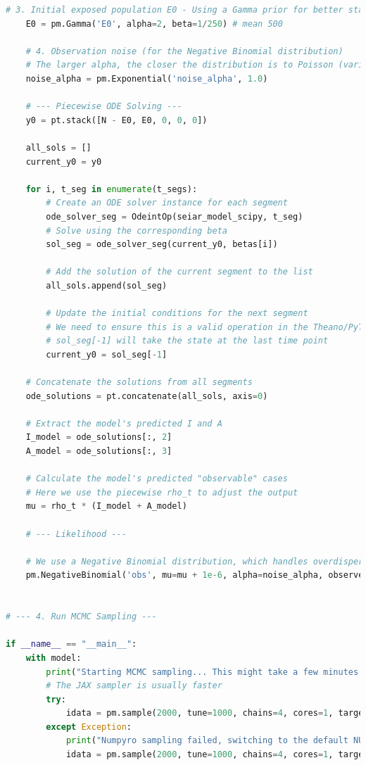 \documentclass[12pt, a4paper]{article}
\begin{document}
\begin{lstlisting}[language=Python, caption=Python script for constructing and sampling the Bayesian SEIAR model using PyMC.]
    # 3. Initial exposed population E0 - Using a Gamma prior for better stability
    E0 = pm.Gamma('E0', alpha=2, beta=1/250) # mean 500
    
    # 4. Observation noise (for the Negative Binomial distribution)
    # The larger alpha, the closer the distribution is to Poisson (variance=mean); the smaller alpha, the larger the variance (overdispersion)
    noise_alpha = pm.Exponential('noise_alpha', 1.0)

    # --- Piecewise ODE Solving ---
    y0 = pt.stack([N - E0, E0, 0, 0, 0])
    
    all_sols = []
    current_y0 = y0

    for i, t_seg in enumerate(t_segs):
        # Create an ODE solver instance for each segment
        ode_solver_seg = OdeintOp(seiar_model_scipy, t_seg)
        # Solve using the corresponding beta
        sol_seg = ode_solver_seg(current_y0, betas[i])
        
        # Add the solution of the current segment to the list
        all_sols.append(sol_seg)
        
        # Update the initial conditions for the next segment
        # We need to ensure this is a valid operation in the Theano/PyTensor computation graph
        # sol_seg[-1] will take the state at the last time point
        current_y0 = sol_seg[-1]

    # Concatenate the solutions from all segments
    ode_solutions = pt.concatenate(all_sols, axis=0)
    
    # Extract the model's predicted I and A
    I_model = ode_solutions[:, 2]
    A_model = ode_solutions[:, 3]
    
    # Calculate the model's predicted "observable" cases
    # Here we use the piecewise rho_t to adjust the output
    mu = rho_t * (I_model + A_model)

    # --- Likelihood ---
    
    # We use a Negative Binomial distribution, which handles overdispersion in epidemic data better than Poisson
    pm.NegativeBinomial('obs', mu=mu + 1e-6, alpha=noise_alpha, observed=i_data)


# --- 4. Run MCMC Sampling ---

if __name__ == "__main__":
    with model:
        print("Starting MCMC sampling... This might take a few minutes...")
        # The JAX sampler is usually faster
        try:
            idata = pm.sample(2000, tune=1000, chains=4, cores=1, target_accept=0.9, nuts_sampler="numpyro")
        except Exception:
            print("Numpyro sampling failed, switching to the default NUTS sampler...")
            idata = pm.sample(2000, tune=1000, chains=4, cores=1, target_accept=0.9)


\end{lstlisting}
\end{document}
